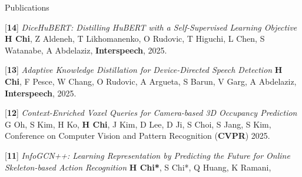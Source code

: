 


\begin{cventries}
\cvpub
{Publications} %
{ %
\begin{cvitems}
    \item {[\textbf{14}] \textit{DiceHuBERT: Distilling HuBERT with a Self-Supervised Learning Objective} \newline
            \hspace{1.5em} \textbf{H Chi}, Z Aldeneh, T Likhomanenko, O Rudovic, T Higuchi, L Chen, S Watanabe, A Abdelaziz,
        \textbf{Interspeech}, 2025.}
    \item {[\textbf{13}] \textit{Adaptive Knowledge Distillation for Device-Directed Speech Detection} \newline
            \hspace{1.5em} \textbf{H Chi}, F Pesce, W Chang, O Rudovic, A Argueta, S Barun, V Garg, A Abdelaziz,  \textbf{Interspeech}, 2025.}
    \item {[\textbf{12}] \textit{Context-Enriched Voxel Queries for Camera-based 3D Occupancy Prediction} \newline
            \hspace{1.5em} G Oh, S Kim, H Ko, \textbf{H Chi}, J Kim, D Lee, D Ji, S Choi, S Jang, S Kim,
        Conference on Computer Vision and Pattern Recognition (\textbf{CVPR}) 2025.}
    \item {[\textbf{11}] \textit{InfoGCN++: Learning Representation by Predicting the Future for Online Skeleton-based Action Recognition}\newline
        \hspace{1.5em} \textbf{H Chi*}, S Chi*, Q Huang, K Ramani, 
}
\end{cvitems}}
\end{cventries}
